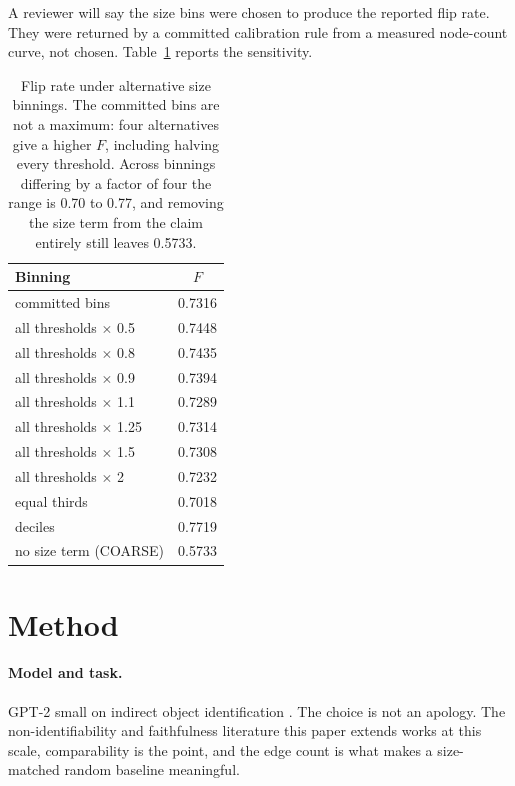 \documentclass[11pt]{article}
\begin{document}
A reviewer will say the size bins were chosen to produce the reported flip rate.
They were returned by a committed calibration rule from a measured node-count
curve, not chosen. Table~\ref{tab:bins} reports the sensitivity.

\begin{table}[htbp]
\centering
\caption{Flip rate under alternative size binnings. The committed bins are not a
maximum: four alternatives give a higher $F$, including halving every threshold.
Across binnings differing by a factor of four the range is 0.70 to 0.77, and
removing the size term from the claim entirely still leaves 0.5733.}
\label{tab:bins}
\begin{tabular}{lc}
\toprule
Binning & $F$ \\
\midrule
committed bins & 0.7316 \\
all thresholds $\times$ 0.5 & 0.7448 \\
all thresholds $\times$ 0.8 & 0.7435 \\
all thresholds $\times$ 0.9 & 0.7394 \\
all thresholds $\times$ 1.1 & 0.7289 \\
all thresholds $\times$ 1.25 & 0.7314 \\
all thresholds $\times$ 1.5 & 0.7308 \\
all thresholds $\times$ 2 & 0.7232 \\
equal thirds & 0.7018 \\
deciles & 0.7719 \\
no size term (COARSE) & 0.5733 \\
\bottomrule
\end{tabular}
\end{table}

\section{Method}

\paragraph{Model and task.} GPT-2 small on indirect object identification
\citep{wang2022}. The choice is not an apology. The non-identifiability and
faithfulness literature this paper extends works at this scale, comparability is
the point, and the edge count is what makes a size-matched random baseline
meaningful.
\end{document}
